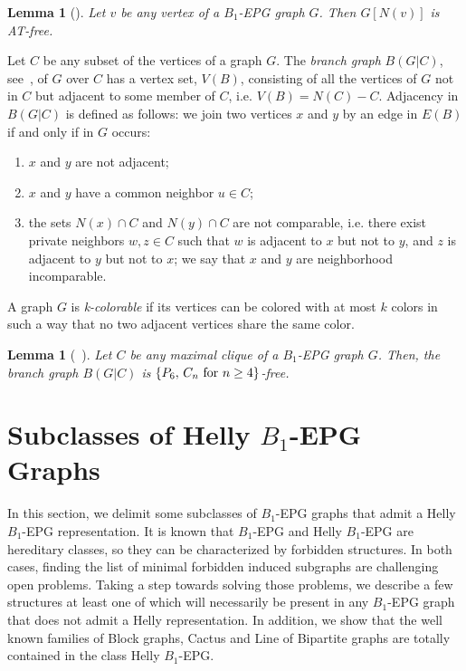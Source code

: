 \documentclass[9pt]{entcs}
\newtheorem{lema}[thm]{Lemma}%
\begin{document}
\begin{lema}
[\cite{ries2009}] \label{l:AT-free} Let $v$ be any vertex of a $B_1$-EPG graph $G$. Then $G[N(v)]$ is AT-free.
\end{lema}

Let $C$ be any subset of the vertices of a graph $G$. The \textit{branch graph} $B(G|C)$, see~\cite{golumbic2009}, of $G$ over $C$ has a vertex set, $V(B)$, consisting of all the vertices of $G$ not in $C$ but adjacent to some member of $C$, i.e. $V(B) = N(C) - C$. Adjacency in $B(G|C)$ is defined as follows: we join two vertices $x$ and $y$ by an edge in $E(B)$ if and only if in $G$ occurs:
\begin{enumerate}
    \item  $x$ and $y$ are not adjacent;
    \item $x$ and $y$ have a common neighbor $u \in C$;
    \item the sets $N(x) \cap C$ and $N(y) \cap C$ are not comparable, i.e. there exist private neighbors $w, z \in C$ such that $w$ is adjacent to $x$ but not to $y$, and $z$ is adjacent to $y$ but not to $x$; we say that $x$ and $y$ are neighborhood incomparable.
\end{enumerate}

A graph $G$ is \textit{k-colorable} if its vertices can be colored with at most $k$ colors in such a way that no two adjacent vertices share the same color. 

\begin{lema}[~\cite{golumbic2009}] \label{l:branch} Let $C$ be any maximal clique of a $B_1$-EPG  graph $G$. Then, the branch graph $B(G|C)$ is $\{P_6, \, C_n \hbox{ for }  n\geq 4\}$-free.
\end{lema}





\section{Subclasses of Helly $B_1$-EPG Graphs}

In this section, we delimit some  subclasses of $B_1$-EPG graphs that admit a Helly $B_1$-EPG representation. It is known that $B_1$-EPG and Helly $B_1$-EPG 
are hereditary classes, so they can  be characterized by forbidden structures. 
In both cases, finding the list of minimal forbidden induced subgraphs are challenging open problems.
Taking a step towards solving
those problems,  we describe a few structures %
at least one of which will  necessarily be present in  any $B_1$-EPG graph that does not admit a Helly representation. 
In addition,
we show that the well known families of Block graphs, Cactus and Line of Bipartite graphs are totally contained in the class Helly $B_1$-EPG.
\end{document}
